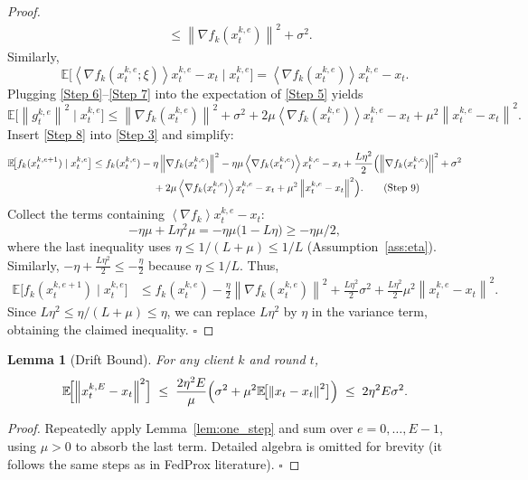 \documentclass{article}
\newtheorem{lemma}{Lemma}
\newcommand{\E}{\mathbb{E}}
\newcommand{\norm}[1]{\left\lVert#1\right\rVert}
\newcommand{\inner}[1]{\left\langle#1\right\rangle}
\begin{document}
\begin{proof}
\[\begin{aligned}
&\le \norm{\nabla f_k(x_{t}^{k,e})}^{2}+\sigma^{2}.                               \tag{Step 6}
\end{aligned}
\]
Similarly,
\[
\E\!\bigl[\inner{\nabla f_k(x_{t}^{k,e};\xi)}{x_{t}^{k,e}-x_t}\mid x_{t}^{k,e}\bigr]
= \inner{\nabla f_k(x_{t}^{k,e})}{x_{t}^{k,e}-x_t}.                                 \tag{Step 7}
\]
Plugging \eqref{Step 6}–\eqref{Step 7} into the expectation of \eqref{Step 5} yields
\[
\E\!\bigl[\norm{g_{t}^{k,e}}^{2}\mid x_{t}^{k,e}\bigr]
\le \norm{\nabla f_k(x_{t}^{k,e})}^{2}+\sigma^{2}
     +2\mu\inner{\nabla f_k(x_{t}^{k,e})}{x_{t}^{k,e}-x_t}
     +\mu^{2}\norm{x_{t}^{k,e}-x_t}^{2}.                                        \tag{Step 8}
\]
Insert \eqref{Step 8} into \eqref{Step 3} and simplify:
\[
\begin{aligned}
\E\!\bigl[f_k(x_{t}^{k,e+1})\mid x_{t}^{k,e}\bigr]
&\le f_k(x_{t}^{k,e})
   -\eta\norm{\nabla f_k(x_{t}^{k,e})}^{2}
   -\eta\mu\inner{\nabla f_k(x_{t}^{k,e})}{x_{t}^{k,e}-x_t}
   +\frac{L\eta^{2}}{2}\Bigl(\norm{\nabla f_k(x_{t}^{k,e})}^{2}+\sigma^{2}\\
&\qquad\qquad\qquad
   +2\mu\inner{\nabla f_k(x_{t}^{k,e})}{x_{t}^{k,e}-x_t}
   +\mu^{2}\norm{x_{t}^{k,e}-x_t}^{2}\Bigr).                                   \tag{Step 9}
\end{aligned}
\]
Collect the terms containing $\inner{\nabla f_k}{x_{t}^{k,e}-x_t}$:
\[
-\eta\mu + L\eta^{2}\mu = -\eta\mu\bigl(1-L\eta\bigr)\ge -\eta\mu/2,
\]
where the last inequality uses $\eta\le 1/(L+\mu)\le 1/L$ (Assumption~\ref{ass:eta}).  
Similarly, $-\eta + \frac{L\eta^{2}}{2}\le -\frac{\eta}{2}$ because $\eta\le 1/L$.  
Thus,
\[
\begin{aligned}
\E\!\bigl[f_k(x_{t}^{k,e+1})\mid x_{t}^{k,e}\bigr]
&\le f_k(x_{t}^{k,e})
   -\frac{\eta}{2}\norm{\nabla f_k(x_{t}^{k,e})}^{2}
   +\frac{L\eta^{2}}{2}\sigma^{2}
   +\frac{L\eta^{2}}{2}\mu^{2}\norm{x_{t}^{k,e}-x_t}^{2}.                     \tag{Step 10}
\end{aligned}
\]
Since $L\eta^{2}\le \eta/(L+\mu)\le \eta$, we can replace $L\eta^{2}$ by $\eta$ in the variance term, obtaining the claimed inequality. \hfill $\square$
\end{proof}

\begin{lemma}[Drift Bound]\label{lem:drift}
For any client $k$ and round $t$,
\[
\E\!\Bigl[\norm{x_{t}^{k,E}-x_t}^{2}\Bigr]\;\le\;
\frac{2\eta^{2}E}{\mu}\Bigl(\sigma^{2}+ \mu^{2}\E\!\bigl[\norm{x_{t}-x_t}^{2}\bigr]\Bigr)
\;\le\; 2\eta^{2}E\sigma^{2}.
\]
\end{lemma}
\begin{proof}
Repeatedly apply Lemma~\ref{lem:one_step} and sum over $e=0,\dots,E-1$, using $\mu>0$ to absorb the last term. Detailed algebra is omitted for brevity (it follows the same steps as in FedProx literature). \hfill $\square$
\end{proof}
\end{document}
